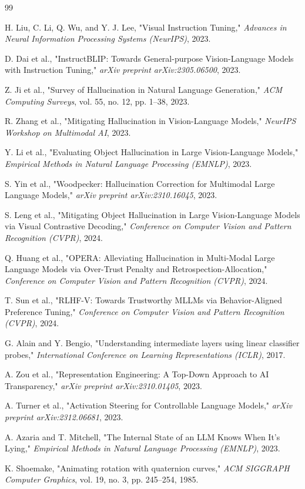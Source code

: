 \documentclass[11pt]{article}
\begin{document}
\begin{thebibliography}{99}
\setlength{\itemsep}{1.5pt}
\setlength{\parskip}{0pt}
\small

H. Liu, C. Li, Q. Wu, and Y. J. Lee,
"Visual Instruction Tuning,"
\emph{Advances in Neural Information Processing Systems (NeurIPS)}, 2023.

D. Dai et al.,
"InstructBLIP: Towards General-purpose Vision-Language Models with Instruction Tuning,"
\emph{arXiv preprint arXiv:2305.06500}, 2023.

Z. Ji et al.,
"Survey of Hallucination in Natural Language Generation,"
\emph{ACM Computing Surveys}, vol. 55, no. 12, pp. 1--38, 2023.

R. Zhang et al.,
"Mitigating Hallucination in Vision-Language Models,"
\emph{NeurIPS Workshop on Multimodal AI}, 2023.

Y. Li et al.,
"Evaluating Object Hallucination in Large Vision-Language Models,"
\emph{Empirical Methods in Natural Language Processing (EMNLP)}, 2023.

S. Yin et al.,
"Woodpecker: Hallucination Correction for Multimodal Large Language Models,"
\emph{arXiv preprint arXiv:2310.16045}, 2023.

S. Leng et al.,
"Mitigating Object Hallucination in Large Vision-Language Models via Visual Contrastive Decoding,"
\emph{Conference on Computer Vision and Pattern Recognition (CVPR)}, 2024.

Q. Huang et al.,
"OPERA: Alleviating Hallucination in Multi-Modal Large Language Models via Over-Trust Penalty and Retrospection-Allocation,"
\emph{Conference on Computer Vision and Pattern Recognition (CVPR)}, 2024.

T. Sun et al.,
"RLHF-V: Towards Trustworthy MLLMs via Behavior-Aligned Preference Tuning,"
\emph{Conference on Computer Vision and Pattern Recognition (CVPR)}, 2024.

G. Alain and Y. Bengio,
"Understanding intermediate layers using linear classifier probes,"
\emph{International Conference on Learning Representations (ICLR)}, 2017.

A. Zou et al.,
"Representation Engineering: A Top-Down Approach to AI Transparency,"
\emph{arXiv preprint arXiv:2310.01405}, 2023.

A. Turner et al.,
"Activation Steering for Controllable Language Models,"
\emph{arXiv preprint arXiv:2312.06681}, 2023.

A. Azaria and T. Mitchell,
"The Internal State of an LLM Knows When It's Lying,"
\emph{Empirical Methods in Natural Language Processing (EMNLP)}, 2023.

K. Shoemake,
"Animating rotation with quaternion curves,"
\emph{ACM SIGGRAPH Computer Graphics}, vol. 19, no. 3, pp. 245--254, 1985.

\end{thebibliography}
\end{document}
